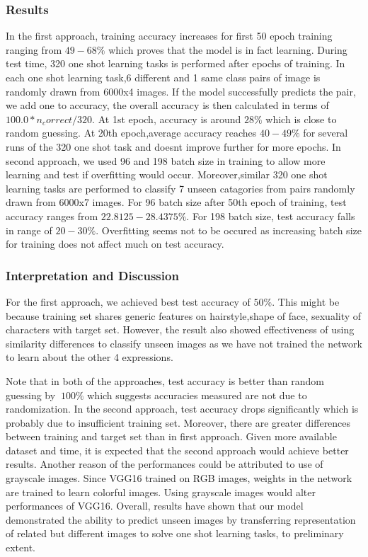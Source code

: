 \documentclass{article}
\begin{document}
\subsubsection{\textbf{Results}}

In the first approach, training accuracy increases for first 50 epoch training ranging from $49-68\%$ which proves that the model is in fact learning. During test time, 320 one shot learning tasks is performed after epochs of training. In each one shot learning task,6 different and 1 same class pairs of image is randomly drawn from 6000x4 images. If the model successfully predicts the pair, we add one to accuracy, the overall accuracy is then calculated in terms of $100.0*n_correct / 320$. At 1st epoch, accuracy is around $28\%$ which is close to random guessing. At 20th epoch,average accuracy reaches $40-49\%$ for several runs of the 320 one shot task and doesnt improve further for more epochs. In second approach, we used 96 and 198 batch size in training to allow more learning and test if overfitting would occur. Moreover,similar 320 one shot learning tasks are performed to classify 7 unseen catagories from pairs randomly drawn from 6000x7 images. For 96 batch size after 50th epoch of training, test accuracy ranges from $22.8125-28.4375\%$. For 198 batch size, test accuracy falls in range of $20-30\%$. Overfitting seems not to be occured as increasing batch size for training does not affect much on test accuracy.

\subsubsection{\textbf{Interpretation and Discussion}}

For the first approach, we achieved best test accuracy of $50\%$. This might be because training set shares generic features on hairstyle,shape of face, sexuality of characters with target set. However, the result also showed effectiveness of using similarity differences to classify unseen images as we have not trained the network to learn about the other 4 expressions.

Note that in both of the approaches, test accuracy is better than random guessing by $~100\%$ which suggests accuracies measured are not due to randomization. In the second approach, test accuracy drops significantly which is probably due to insufficient training set. Moreover, there are greater differences between training and target set than in first approach. Given more available dataset and time, it is expected that the second approach would achieve better results. Another reason of the performances could be attributed to use of grayscale images. Since VGG16 trained on RGB images, weights in the network are trained to learn colorful images. Using grayscale images would alter performances of VGG16. Overall, results have shown that our model demonstrated the ability to predict unseen images by transferring representation of related but different images to solve one shot learning tasks, to preliminary extent. 
\end{document}
